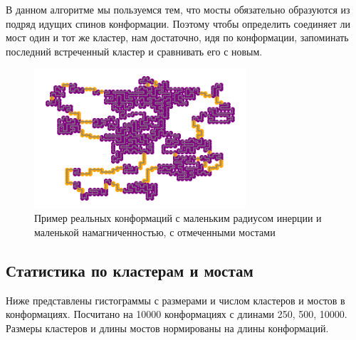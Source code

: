 В данном алгоритме мы пользуемся тем, что мосты обязательно образуются из подряд идущих спинов конформации. Поэтому чтобы определить соединяет ли мост один и тот же кластер, нам достаточно, идя по конформации, запоминать последний встреченный кластер и сравнивать его с новым.

\begin{figure}[h]
	\centering
	\includegraphics[width=0.70\textwidth]{../images/bridges_example_1.png}  
	\caption{Пример реальных конформаций с маленьким радиусом инерции и маленькой намагниченностью, с отмеченными мостами}
	\label{fig:clusters_and_bridges}
\end{figure}

\subsection{Статистика по кластерам и мостам}
Ниже представлены гистограммы с размерами и числом кластеров и мостов в конформациях. Посчитано на 10000 конформациях с длинами 250, 500, 10000. Размеры кластеров и длины мостов нормированы на длины конформаций. 



